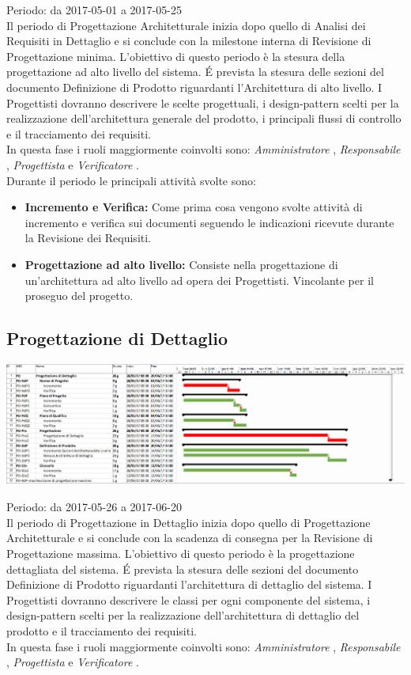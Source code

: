 Periodo: da 2017-05-01 a 2017-05-25 \\
Il periodo di Progettazione Architetturale inizia dopo quello di Analisi dei Requisiti
in Dettaglio e si conclude con la milestone interna di Revisione di Progettazione minima.
L'obiettivo di questo periodo è la stesura della progettazione ad alto livello del sistema.
\'E prevista la stesura delle sezioni del documento Definizione di Prodotto riguardanti l'Architettura di alto livello. 
I Progettisti dovranno descrivere le scelte progettuali, i design-pattern scelti per la realizzazione dell'architettura generale del prodotto, i principali flussi di controllo e il tracciamento dei requisiti. \\
In questa fase i ruoli maggiormente coinvolti sono:  \emph{Amministratore} ,  \emph{Responsabile} ,
 \emph{Progettista}  e  \emph{Verificatore} . \\
 Durante il periodo le principali attività svolte sono:
\begin{itemize}
\item \textbf{Incremento e Verifica:} Come prima cosa vengono svolte attività di incremento e verifica sui documenti seguendo le indicazioni ricevute durante la Revisione dei Requisiti.
\item \textbf{Progettazione ad alto livello:} Consiste nella progettazione di un'architettura ad alto livello ad opera dei Progettisti.
Vincolante per il proseguo del progetto.
\end{itemize}

\subsection{Progettazione di Dettaglio}

\begin{center}
  \includegraphics[scale=0.2]{img/4-PD.png}
\end{center}

Periodo: da 2017-05-26 a 2017-06-20 \\
Il periodo di Progettazione in Dettaglio inizia dopo quello di Progettazione Architetturale
e si conclude con la scadenza di consegna per la Revisione di Progettazione massima.
L'obiettivo di questo periodo è la progettazione dettagliata del sistema.
\'E prevista la stesura delle sezioni del documento Definizione di Prodotto riguardanti l'architettura di dettaglio del sistema.
I Progettisti dovranno descrivere le classi per ogni componente del sistema, i design-pattern scelti per la realizzazione dell'architettura di dettaglio del prodotto e il tracciamento dei requisiti. \\
In questa fase i ruoli maggiormente coinvolti sono:  \emph{Amministratore} ,  \emph{Responsabile} ,
 \emph{Progettista}  e  \emph{Verificatore} .

